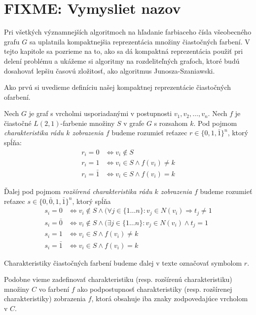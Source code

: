 \chapter{FIXME: Vymysliet nazov}

Pri všetkých významnejších algoritmoch na hľadanie farbiaceho čísla všeobecného grafu $G$
sa uplatnila kompaktnejšia reprezentácia množiny čiastočných farbení. V tejto kapitole sa pozrieme na to,
ako sa dá kompaktná reprezentácia použiť pri delení problému a ukážeme si algoritmy na
rozdeliteľných grafoch, ktoré budú dosahovať lepšiu časovú zložitosť, ako algoritmus
Junosza-Szaniawski.

Ako prvú si uvedieme definíciu našej kompaktnej reprezentácie čiastočných ofarbení.

\begin{defn}
    Nech $G$ je graf s vrcholmi usporiadanými v postupnosti $v_1,v_2, \ldots, v_n$.
    Nech $f$ je čiastočné $L(2,1)$-farbenie množiny $S$ v grafe $G$ s rozsahom $k$. Pod pojmom \emph{charakteristika rádu $k$
    zobrazenia $f$} budeme rozumieť reťazec $r \in \{0, 1, \bar{1}\}^n$, ktorý spĺňa:
    \begin{align*}
        r_i = 0 & \Leftrightarrow v_i \notin S \\
        r_i = 1 & \Leftrightarrow v_i \in S \wedge f(v_i) \neq k \\
        r_i = \bar{1} & \Leftrightarrow v_i \in S \wedge f(v_i) = k
    \end{align*}

    Ďalej pod pojmom \emph{rozšírená charakteristika rádu $k$ zobrazenia $f$} budeme rozumieť reťazec
    $s \in \{0, \bar{0}, 1, \bar{1}\}^n$, ktorý spĺňa
    \begin{align*}
        s_i = 0 & \Leftrightarrow v_i \notin S \wedge (\forall j \in \{1 \dots n\}: v_j \in N(v_i) \Rightarrow t_j \neq 1 \\
        s_i = \bar{0} & \Leftrightarrow v_i \notin S \wedge (\exists j \in \{1 \dots n\}: v_j \in N(v_i) \wedge t_j = 1 \\
        s_i = 1 & \Leftrightarrow v_i \in S \wedge f(v_i) \neq k \\
        s_i = \bar{1} & \Leftrightarrow v_i \in S \wedge f(v_i) = k
    \end{align*}

    Charakteristiky čiastočných farbení budeme ďalej v texte označovať symbolom $r$.
\end{defn}

Podobne vieme zadefinovať charakteristiku (resp. rozšírenú charakteristiku) množiny $C$ vo
farbení $f$ ako podpostupnosť charakteristiky (resp. rozšírenej charakteristiky) zobrazenia
$f$, ktorá obsahuje iba znaky zodpovedajúce vrcholom v $C$.

